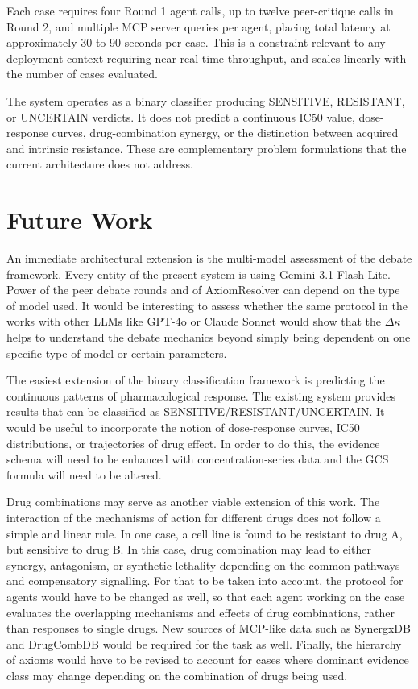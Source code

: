 \documentclass{article}
\begin{document}
Each case requires four Round 1 agent calls, up to twelve peer-critique calls in Round 2, and multiple MCP server queries per agent, placing total latency at approximately 30 to 90 seconds per case. This is a constraint relevant to any deployment context requiring near-real-time throughput, and scales linearly with the number of cases evaluated.

The system operates as a binary classifier producing SENSITIVE, RESISTANT, or UNCERTAIN verdicts. It does not predict a continuous IC50 value, dose-response curves, drug-combination synergy, or the distinction between acquired and intrinsic resistance. These are complementary problem formulations that the current architecture does not
address.

\section{Future Work}
An immediate architectural extension is the multi-model assessment of the debate framework. Every entity of the present system is using Gemini 3.1 Flash Lite. Power of the peer debate rounds and of AxiomResolver can depend on the type of model used. It would be interesting to assess whether the same protocol in the works with other LLMs like GPT-4o or Claude Sonnet would show that the $\Delta\kappa$ helps to understand the debate mechanics beyond simply being dependent on one specific type of model or certain parameters. 

The easiest extension of the binary classification framework is predicting the continuous patterns of pharmacological response. The existing system provides results that can be classified as SENSITIVE/RESISTANT/UNCERTAIN. It would be useful to incorporate the notion of dose-response curves, IC50 distributions, or trajectories of drug effect. In order to do this, the evidence schema will need to be enhanced with concentration-series data and the GCS formula will need to be altered.

Drug combinations may serve as another viable extension of this work. The interaction of the mechanisms of action for different drugs does not follow a simple and linear rule. In one case, a cell line is found to be resistant to drug A, but sensitive to drug B. In this case, drug combination may lead to either synergy, antagonism, or synthetic lethality depending on the common pathways and compensatory signalling. For that to be taken into account, the protocol for agents would have to be changed as well, so that each agent working on the case evaluates the overlapping mechanisms and effects of drug combinations, rather than responses to single drugs. New sources of MCP-like data such as SynergxDB and DrugCombDB would be required for the task as well. Finally, the hierarchy of axioms would have to be revised to account for cases where dominant evidence class may change depending on the combination of drugs being used.
\end{document}
